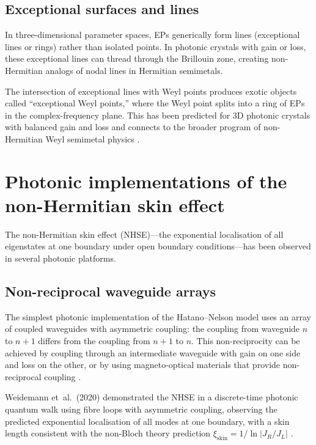 \subsection{Exceptional surfaces and lines}
\label{sec:ch17-exceptional-surfaces}

In three-dimensional parameter spaces, EPs generically form lines
(exceptional lines or rings) rather than isolated points.  In
photonic crystals with gain or loss, these exceptional lines can
thread through the Brillouin zone, creating non-Hermitian analogs
of nodal lines in Hermitian semimetals.

The intersection of exceptional lines with Weyl points produces
exotic objects called ``exceptional Weyl points,'' where the Weyl
point splits into a ring of EPs in the complex-frequency plane.  This
has been predicted for 3D photonic crystals with balanced gain and
loss and connects to the broader program of non-Hermitian Weyl
semimetal physics \cite{yang2019non,wang2021topological}.

\section{Photonic implementations of the non-Hermitian skin effect}
\label{sec:ch17-photonic-skin}

The non-Hermitian skin effect (NHSE)---the exponential localisation
of all eigenstates at one boundary under open boundary
conditions---has been observed in several photonic platforms.

\subsection{Non-reciprocal waveguide arrays}
\label{sec:ch17-skin-waveguide}

The simplest photonic implementation of the Hatano--Nelson model uses
an array of coupled waveguides with asymmetric coupling: the
coupling from waveguide $n$ to $n+1$ differs from the coupling from
$n+1$ to $n$.  This non-reciprocity can be achieved by coupling
through an intermediate waveguide with gain on one side and loss on
the other, or by using magneto-optical materials that provide
non-reciprocal coupling \cite{longhi2019probing,okuma2020topological}.

Weidemann et~al.\ (2020) demonstrated the NHSE in a
discrete-time photonic quantum walk using fibre loops with
asymmetric coupling, observing the predicted exponential localisation
of all modes at one boundary, with a skin length consistent with the
non-Bloch theory prediction
$\xi_{\mathrm{skin}} = 1/\ln|J_R/J_L|$
\cite{okuma2020topological,imura2020generalized}.

